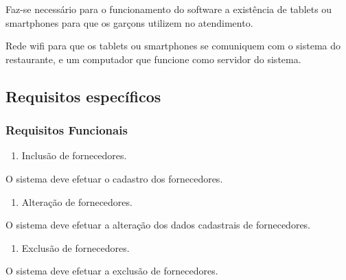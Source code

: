 {
\textcolor[rgb]{0.078431375,0.09411765,0.13725491}{Faz-se necessário para o funcionamento do software a existência de
tablets ou smartphones para que os garçons utilizem no atendimento.}}

{
\textcolor[rgb]{0.078431375,0.09411765,0.13725491}{Rede wifi para que os tablets ou smartphones se comuniquem com o
sistema do restaurante, e um computador que funcione como servidor do sistema.}}
\bigskip

\clearpage\subsection[Requisitos específicos]{\textbf{\textcolor[rgb]{0.078431375,0.09411765,0.13725491}{Requisitos específicos}}}
{
\subsubsection{\textcolor[rgb]{0.078431375,0.09411765,0.13725491}{Requisitos Funcionais}}}

\liststyleWWNumi
\begin{enumerate}
\item {
Inclusão\textcolor[rgb]{0.078431375,0.09411765,0.13725491}{ de fornecedores.}}
\end{enumerate}
{
\textcolor[rgb]{0.078431375,0.09411765,0.13725491}{O sistema deve efetuar o }cadastro dos
fornecedores\textcolor[rgb]{0.078431375,0.09411765,0.13725491}{.}}

\liststyleWWNumi
\setcounter{saveenum}{\value{enumi}}
\begin{enumerate}
\setcounter{enumi}{\value{saveenum}}
\item {
\textcolor[rgb]{0.078431375,0.09411765,0.13725491}{Alteração de fornecedores.}}
\end{enumerate}
{
\textcolor[rgb]{0.078431375,0.09411765,0.13725491}{O sistema deve efetuar a alteração dos dados cadastrais de
fornecedores.}}

\liststyleWWNumi
\setcounter{saveenum}{\value{enumi}}
\begin{enumerate}
\setcounter{enumi}{\value{saveenum}}
\item {
\textcolor[rgb]{0.078431375,0.09411765,0.13725491}{Exclusão de fornecedores.}}
\end{enumerate}
{
\textcolor[rgb]{0.078431375,0.09411765,0.13725491}{O sistema deve efetuar a exclusão de fornecedores.}}

